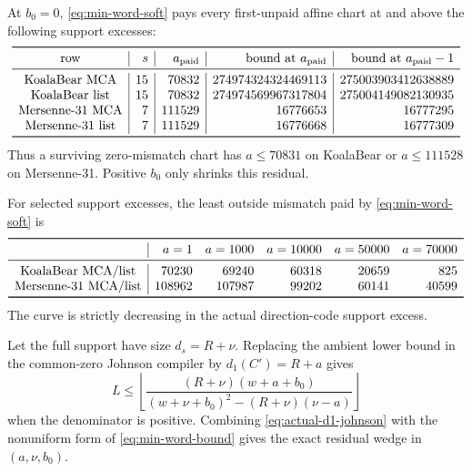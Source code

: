 \documentclass[11pt,a4paper]{amsart}
\numberwithin{equation}{section}
\theoremstyle{remark}
\begin{document}
\begin{proposition}
\label{prop:min-support-transitions}
At $b_0=0$, \eqref{eq:min-word-soft} pays every first-unpaid affine chart at and above the following support excesses:
\[
\begin{array}{c|r|r|r|r}
\toprule
\text{row}&s&a_{\rm paid}&\text{bound at }a_{\rm paid}&\text{bound at }a_{\rm paid}-1\\
\midrule
\text{KoalaBear MCA}&15&70832&274974324324469113&275003903412638889\\
\text{KoalaBear list}&15&70832&274974569967317804&275004149082130935\\
\text{Mersenne-31 MCA}&7&111529&16776653&16777295\\
\text{Mersenne-31 list}&7&111529&16776668&16777309\\
\bottomrule
\end{array}
\]
Thus a surviving zero-mismatch chart has $a\le70831$ on KoalaBear or $a\le111528$ on Mersenne-31.  Positive $b_0$ only shrinks this residual.
\end{proposition}

\begin{proposition}
\label{prop:min-mismatch-curve}
For selected support excesses, the least outside mismatch paid by \eqref{eq:min-word-soft} is
\[
\begin{array}{c|rrrrr}
\toprule
& a=1&a=1000&a=10000&a=50000&a=70000\\
\midrule
\text{KoalaBear MCA/list}&70230&69240&60318&20659&825\\
\text{Mersenne-31 MCA/list}&108962&107987&99202&60141&40599\\
\bottomrule
\end{array}
\]
The curve is strictly decreasing in the actual direction-code support excess.
\end{proposition}

\begin{remark}
Let the full support have size $d_s=R+\nu$.  Replacing the ambient lower bound in the common-zero Johnson compiler by $d_1(C')=R+a$ gives
\begin{equation}
 L\le
 \left\lfloor
 \frac{(R+\nu)(w+a+b_0)}
 {(w+\nu+b_0)^2-(R+\nu)(\nu-a)}
 \right\rfloor
 \label{eq:actual-d1-johnson}
\end{equation}
when the denominator is positive.  Combining \eqref{eq:actual-d1-johnson} with the nonuniform form of \eqref{eq:min-word-bound} gives the exact residual wedge in $(a,\nu,b_0)$.
\end{remark}
\end{document}
